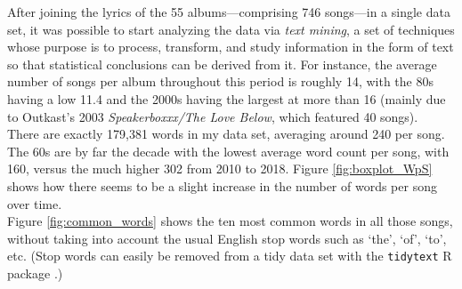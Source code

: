 \documentclass{article}
\begin{document}




After joining the lyrics of the 55 albums---comprising 746 songs---in a single data set, it was possible to start analyzing the data via \textit{text mining}, a set of techniques whose purpose is to process, transform, and study information in the form of text so that statistical conclusions can be derived from it. For instance, the average number of songs per album throughout this period is roughly 14, with the 80s having a low 11.4 and the 2000s having the largest at more than 16 (mainly due to Outkast's 2003 \textit{Speakerboxxx/The Love Below}, which featured 40 songs). \\


There are exactly 179,381 words in my data set, averaging around 240 per song. The 60s are by far the decade with the lowest average word count per song, with 160, versus the much higher 302 from 2010 to 2018. Figure \ref{fig:boxplot_WpS} shows how there seems to be a slight increase in the number of words per song over time. \\

Figure \ref{fig:common_words} shows the ten most common words in all those songs, without taking into account the usual English stop words such as `the', `of', `to', etc. (Stop words can easily be removed from a tidy data set with the \texttt{tidytext} \textsf{R} package \citep{text_mining_r}.)
\end{document}
